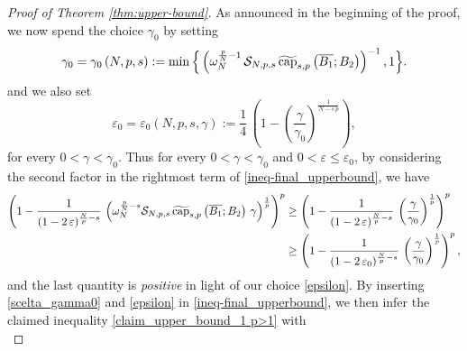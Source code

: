 \documentclass{amsart}
\theoremstyle{definition}
\numberwithin{equation}{section}
\begin{document}
\begin{proof}[Proof of Theorem \ref{thm:upper-bound}]

	As announced in the beginning of the proof, we now spend the choice $\gamma_0$ by setting 
	\begin{equation} \label{scelta_gamma0}
		\gamma_0 = \gamma_0\left(N,p,s\right) :=  \min\Big\{\left(\omega_N^{\frac{p}{N}-1}\,\mathcal{S}_{N,p,s}\,\widetilde{{\rm cap}}_{s,p}\left(\overline{B_1}; B_{2}\right)\right)^{-1}, 1 \Big\}.
	\end{equation}
	and we also set 
	\begin{equation} \label{epsilon}
		\varepsilon_0 = \varepsilon_0(N, p, s, \gamma) := \frac{1}{4}\,\left(1 - \left(\frac{\gamma}{\gamma_0}\right)^{\frac{1}{N-s\,p}}\right),
	\end{equation}
	for every $0 < \gamma < \gamma_0$.
	Thus for every $ 0 < \gamma < \gamma_0$ and $0 < \varepsilon \le \varepsilon_0$, by considering the second factor in the rightmost term of \eqref{ineq-final_upperbound}, we have   
	\[
	\begin{split}
		\left(1- \frac{1}{(1-2\,\varepsilon)^{\frac{N}{p} -s }}\,\left(\omega_N^{\frac{p}{N}-s}\mathcal{S}_{N,p,s}\,\widetilde{{\rm cap}}_{s,p}\left(\overline{B_1}; B_{2}\right)\,\gamma\right)^{\frac{1}{p}}\right)^p &\ge \left(1 - \frac{1}{(1-2\,\varepsilon)^{\frac{N}{p} - s}}\,\left(\frac{\gamma}{\gamma_0}\right)^{\frac{1}{p}}\right)^p \\ &\ge  \left(1 - \frac{1}{(1-2\,\varepsilon_0)^{\frac{N}{p} - s}}\,\left(\frac{\gamma}{\gamma_0}\right)^{\frac{1}{p}}\right)^p, 
	\end{split}
	\]
 and the last quantity is {\it positive} in light of our choice \eqref{epsilon}. 
	By inserting \eqref{scelta_gamma0} and \eqref{epsilon} in \eqref{ineq-final_upperbound}, we then infer the claimed inequality \eqref{claim_upper_bound_1 p>1} with
	\begin{equation}\label{costante upper bound}

\end{equation}
\end{proof}
\end{document}
